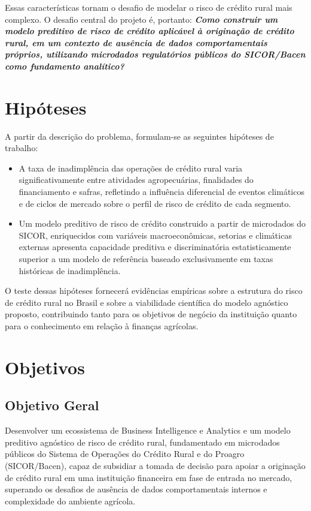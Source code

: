 Essas características tornam o desafio de modelar o risco de crédito rural mais complexo. O desafio central do projeto é, portanto: \textbf{\textit{Como construir um modelo preditivo de risco de crédito aplicável à originação de crédito rural, em um contexto de ausência de dados comportamentais próprios, utilizando microdados regulatórios públicos do SICOR/Bacen como fundamento analítico?}}

\section{Hipóteses}

A partir da descrição do problema, formulam-se as seguintes hipóteses de trabalho:
\begin{itemize}
    \item[\textbf{H1:}] A taxa de inadimplência das operações de crédito rural varia significativamente entre atividades agropecuárias, finalidades do financiamento e safras, refletindo a influência diferencial de eventos climáticos e de ciclos de mercado sobre o perfil de risco de crédito de cada segmento.
    \item[\textbf{H2:}] Um modelo preditivo de risco de crédito construido a partir de microdados do SICOR, enriquecidos com variáveis macroeconômicas, setorias e climáticas externas apresenta capacidade preditiva e discriminatória estatisticamente superior a um modelo de referência baseado exclusivamente em taxas históricas de inadimplência.
\end{itemize}

O teste dessas hipóteses fornecerá evidências empíricas sobre a estrutura do risco de crédito rural no Brasil e sobre a viabilidade científica do modelo agnóstico proposto, contribuindo tanto para os objetivos de negócio da instituição quanto para o conhecimento em relação à finanças agrícolas.

\section{Objetivos}

\subsection{Objetivo Geral}

Desenvolver um ecossistema de Business Intelligence e Analytics e um modelo preditivo agnóstico de risco de crédito rural, fundamentado em microdados públicos do Sistema de Operações do Crédito Rural e do Proagro (SICOR/Bacen), capaz de subsidiar a tomada de decisão para apoiar a originação de crédito rural em uma instituição financeira em fase de entrada no mercado, superando os desafios de ausência de dados comportamentais internos e complexidade do ambiente agrícola.

